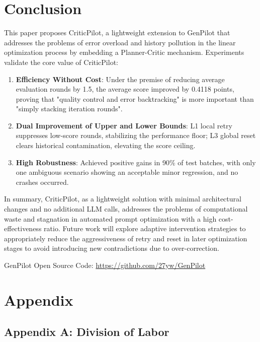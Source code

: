 \documentclass[UTF8]{article} %
\begin{document}
\section{Conclusion}\label{conclusion}

This paper proposes CriticPilot, a lightweight extension to GenPilot
that addresses the problems of error overload and history pollution in
the linear optimization process by embedding a Planner-Critic mechanism.
Experiments validate the core value of CriticPilot:

\begin{enumerate}
\def\labelenumi{\arabic{enumi}.}
\item
  \textbf{Efficiency Without Cost}: Under the premise of reducing
  average evaluation rounds by 1.5, the average score improved by 0.4118
  points, proving that "quality control and error backtracking" is more
  important than "simply stacking iteration rounds".
\item
  \textbf{Dual Improvement of Upper and Lower Bounds}: L1 local retry
  suppresses low-score rounds, stabilizing the performance floor; L3
  global reset clears historical contamination, elevating the score
  ceiling.
\item
  \textbf{High Robustness}: Achieved positive gains in 90\% of test
  batches, with only one ambiguous scenario showing an acceptable minor
  regression, and no crashes occurred.
\end{enumerate}

In summary, CriticPilot, as a lightweight solution with minimal
architectural changes and no additional LLM calls, addresses the
problems of computational waste and stagnation in automated prompt
optimization with a high cost-effectiveness ratio. Future work will
explore adaptive intervention strategies to appropriately reduce the
aggressiveness of retry and reset in later optimization stages to avoid
introducing new contradictions due to over-correction.





GenPilot Open Source Code: \url{https://github.com/27yw/GenPilot}

\appendix
\section{Appendix}

\subsection{Appendix A: Division of
Labor}\label{appendix-a-division-of-labor}
\end{document}
